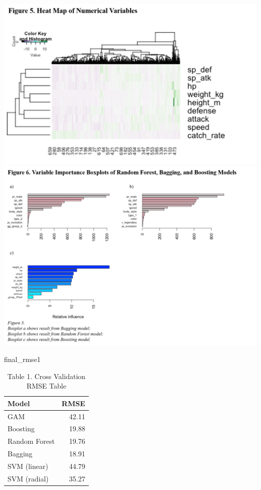 \documentclass[
]{article}
\newenvironment{Shaded}{\begin{snugshade}}{\end{snugshade}}
\newcommand{\NormalTok}[1]{#1}
\begin{document}
\includegraphics{anno_fig/fig5.png} \includegraphics{anno_fig/fig6.png}

\begin{Shaded}
\begin{Highlighting}[]
\NormalTok{final_rmse1}
\end{Highlighting}
\end{Shaded}

\begin{table}

\caption{\label{tab:unnamed-chunk-12}Table 1. Cross Validation RMSE Table}
\centering
\begin{tabular}[t]{l|r}
\hline
Model & RMSE\\
\hline
GAM & 42.11\\
\hline
Boosting & 19.88\\
\hline
Random Forest & 19.76\\
\hline
Bagging & 18.91\\
\hline
SVM (linear) & 44.79\\
\hline
SVM (radial) & 35.27\\
\hline
\end{tabular}
\end{table}
\end{document}
